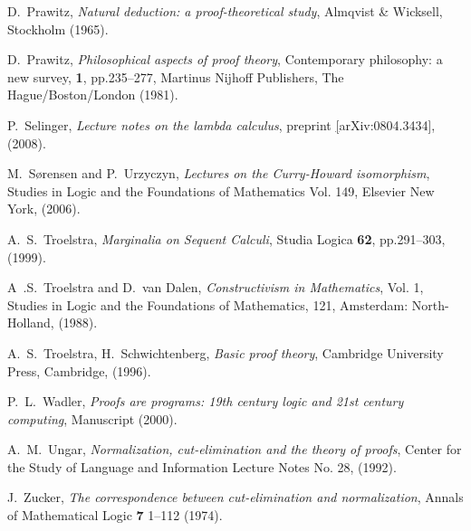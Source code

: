 \documentclass[english,letter paper,12pt,leqno]{article}
\theoremstyle{example}
\numberwithin{equation}{section}
\begin{document}
\begin{thebibliography}{BHLS03}
D.~Prawitz, \textsl{Natural deduction: a proof-theoretical study}, Almqvist \& Wicksell, Stockholm (1965).

D.~Prawitz, \textsl{Philosophical aspects of proof theory}, Contemporary philosophy: a new survey, \textbf{1}, pp.235--277, Martinus Nijhoff Publishers, The Hague/Boston/London (1981).

P.~Selinger, \textsl{Lecture notes on the lambda calculus}, preprint \href{https://arxiv.org/abs/0804.3434}[arXiv:0804.3434], (2008).

M.~S\o rensen and P.~Urzyczyn, \textsl{Lectures on the Curry-Howard isomorphism}, Studies in Logic and the Foundations of Mathematics Vol. 149, Elsevier New York, (2006).

A.~S.~Troelstra, \textsl{Marginalia on Sequent Calculi}, Studia Logica \textbf{62}, pp.291--303, (1999).

A~.S.~Troelstra and D.~van Dalen, \textsl{Constructivism in Mathematics}, Vol. 1, Studies in Logic and the Foundations of Mathematics, 121, Amsterdam: North-Holland, (1988).

A.~S.~Troelstra, H.~Schwichtenberg, \textsl{Basic proof theory}, Cambridge University Press, Cambridge, (1996).

P.~L.~Wadler, \textsl{Proofs are programs: 19th century logic and 21st century computing}, Manuscript (2000).

A.~M.~Ungar, \textsl{Normalization, cut-elimination and the theory of proofs}, Center for the Study of Language and Information Lecture Notes No. 28, (1992).

J.~Zucker, \textsl{The correspondence between cut-elimination and normalization}, Annals of Mathematical Logic \textbf{7} 1--112 (1974).


\end{thebibliography}
\end{document}
